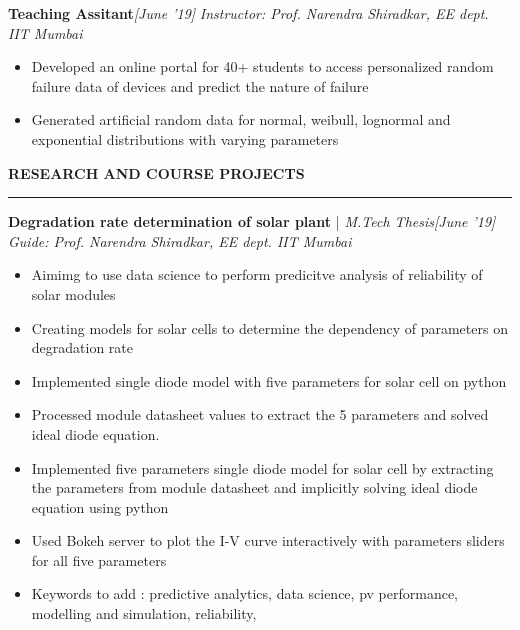 \documentclass[10 pt]{article}%
\begin{document}
{\flushleft \bf {\large{Teaching Assitant}}}\hfill {{{\em{[June '19]}}}}
\vspace{-0.8em}
{\flushleft \em{Instructor: Prof. Narendra Shiradkar, EE dept. IIT Mumbai}}
\vspace{-5pt}
\begin{itemize}[leftmargin=*]
	\setlength\itemsep{1.5pt}
	\setlength\parskip{1.5pt}
	\item Developed an online portal for 40+ students to access personalized random failure data of devices and predict the nature of failure
	\item Generated artificial random data for normal, weibull, lognormal and exponential distributions with varying parameters
\end{itemize}
\begin{flushleft}\bf{\Large{RESEARCH AND COURSE PROJECTS}}\end{flushleft}
\vspace{-1mm}
\hrule
\vspace{1 pt}
{\flushleft \textbf {\large{Degradation rate determination of solar plant}} |\em{ M.Tech Thesis}}\hfill {{{\em{[June '19]}}}}
\vspace{-0.8em}
{\flushleft \em{Guide: Prof. Narendra Shiradkar, EE dept. IIT Mumbai}}
\vspace{-5pt}
\begin{itemize}[leftmargin=*]
	\setlength\itemsep{1.5pt}
	\setlength\parskip{1.5pt}
	\item Aimimg to use data science to perform predicitve analysis of reliability of solar modules
	\item Creating models for solar cells to determine the dependency of parameters on degradation rate
	\item Implemented single diode model with five parameters for solar cell on python 
	\item Processed module datasheet values to extract the 5 parameters and solved ideal diode equation.
	\item Implemented five parameters single diode model for solar cell by extracting the parameters from module datasheet and implicitly solving ideal diode equation using python
	\item Used Bokeh server to plot the I-V curve interactively with parameters sliders for all five parameters
	\item Keywords to add : predictive analytics, data science, pv performance, modelling and simulation, reliability,
\end{itemize}
\end{document}
